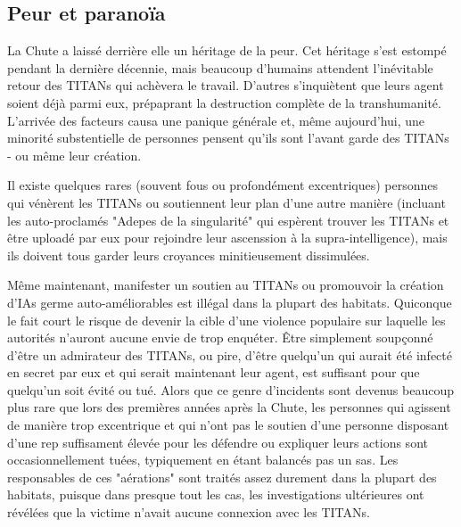 \subsection{Peur et paranoïa} \label{sec:fear-paranoia} 

La Chute a laissé derrière elle un héritage de la peur. Cet héritage s'est estompé pendant la dernière décennie, mais beaucoup d'humains attendent l'inévitable retour des TITANs qui achèvera le travail. D'autres s'inquiètent que leurs agent soient déjà parmi eux, prépaprant la destruction complète de la transhumanité. L'arrivée des facteurs causa une panique générale et, même aujourd'hui, une minorité substentielle de personnes pensent qu'ils sont l'avant garde des TITANs - ou même leur création. 

Il existe quelques rares (souvent fous ou profondément excentriques) personnes qui vénèrent les TITANs ou soutiennent leur plan d'une autre manière (incluant les auto-proclamés "Adepes de la singularité" qui espèrent trouver les TITANs et être uploadé par eux pour rejoindre leur ascenssion à la supra-intelligence), mais ils doivent tous garder leurs croyances minitieusement dissimulées. 

Même maintenant, manifester un soutien au TITANs ou promouvoir la création d'IAs germe auto-améliorables est illégal dans la plupart des habitats. Quiconque le fait court le risque de devenir la cible d'une violence populaire sur laquelle les autorités n'auront aucune envie de trop enquéter. Être simplement soupçonné d'être un admirateur des TITANs, ou pire, d'être quelqu'un qui aurait été infecté en secret par eux et qui serait maintenant leur agent, est suffisant pour que quelqu'un soit évité ou tué. Alors que ce genre d'incidents sont devenus beaucoup plus rare que lors des premières années après la Chute, les personnes qui agissent de manière trop excentrique et qui n'ont pas le soutien d'une personne disposant d'une rep suffisament élevée pour les défendre ou expliquer leurs actions sont occasionnellement tuées, typiquement en étant balancés pas un sas. Les responsables de ces "aérations" sont traités assez durement dans la plupart des habitats, puisque dans presque tout les cas, les investigations ultérieures ont révélées que la victime n'avait aucune connexion avec les TITANs. 

